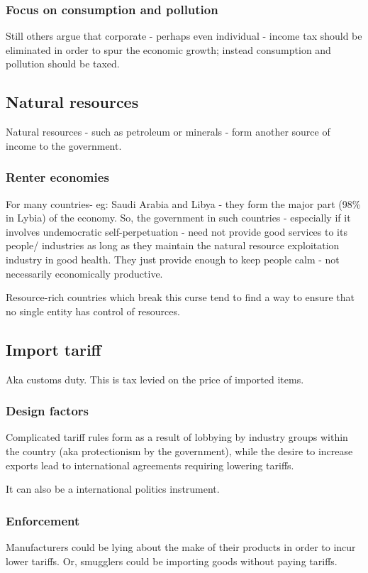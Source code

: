 \documentclass[oneside, article]{memoir}
\begin{document}
\subsubsection{Focus on consumption and pollution}
Still others argue that corporate - perhaps even individual - income tax should be eliminated in order to spur the economic growth; instead consumption and pollution should be taxed.

\subsection{Natural resources}
Natural resources - such as petroleum or minerals - form another source of income to the government.

\subsubsection{Renter economies}
For many countries- eg: Saudi Arabia and Libya - they form the major part (98\% in Lybia) of the economy. So, the government in such countries - especially if it involves undemocratic self-perpetuation - need not provide good services to its people/ industries as long as they maintain the natural resource exploitation industry in good health. They just provide enough to keep people calm - not necessarily economically productive.

Resource-rich countries which break this curse tend to find a way to ensure that no single entity has control of resources.

\subsection{Import tariff}
Aka customs duty. This is tax levied on the price of imported items.

\subsubsection{Design factors}
Complicated tariff rules form as a result of lobbying by industry groups within the country (aka protectionism by the government), while the desire to increase exports lead to international agreements requiring lowering tariffs.

It can also be a international politics instrument.

\subsubsection{Enforcement}
Manufacturers could be lying about the make of their products in order to incur lower tariffs. Or, smugglers could be importing goods without paying tariffs.
\end{document}

